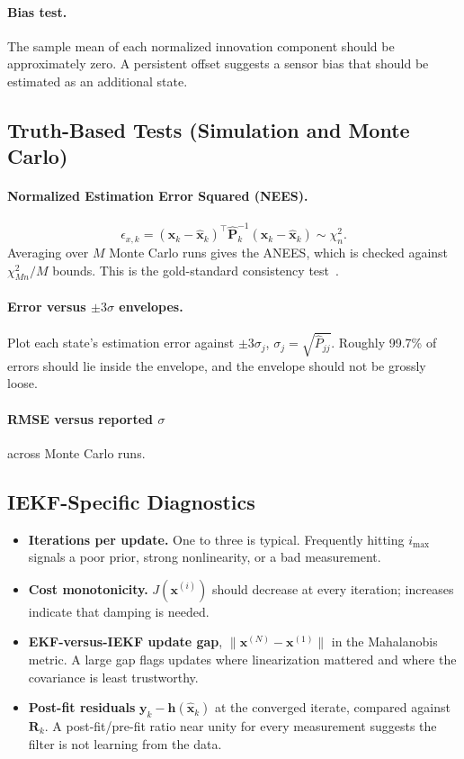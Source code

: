 \documentclass[11pt]{article}
\newcommand{\x}{\bm{x}}
\newcommand{\y}{\bm{y}}
\newcommand{\meas}{\bm{h}}
\newcommand{\Pm}{\bm{P}}
\newcommand{\R}{\bm{R}}
\newcommand{\xhat}{\hat{\x}}
\newcommand{\Phat}{\hat{\Pm}}
\newcommand{\iter}[1]{^{(#1)}}
\begin{document}
\paragraph{Bias test.}
The sample mean of each normalized innovation component should be approximately zero. A
persistent offset suggests a sensor bias that should be estimated as an additional state.

\subsection{Truth-Based Tests (Simulation and Monte Carlo)}

\paragraph{Normalized Estimation Error Squared (NEES).}
\begin{equation}
  \epsilon_{x,k} = (\x_k - \xhat_k)^\top \Phat_k^{-1} (\x_k - \xhat_k) \sim \chi^2_n .
\end{equation}
Averaging over $M$ Monte Carlo runs gives the ANEES, which is checked against
$\chi^2_{Mn}/M$ bounds. This is the gold-standard consistency test~\cite{barshalom2001}.

\paragraph{Error versus $\pm 3\sigma$ envelopes.}
Plot each state's estimation error against $\pm 3\sigma_j$, $\sigma_j = \sqrt{\hat P_{jj}}$.
Roughly 99.7\% of errors should lie inside the envelope, and the envelope should not be
grossly loose.

\paragraph{RMSE versus reported $\sigma$} across Monte Carlo runs.

\subsection{IEKF-Specific Diagnostics}
\begin{itemize}
  \item \textbf{Iterations per update.} One to three is typical. Frequently hitting $i_{\max}$
        signals a poor prior, strong nonlinearity, or a bad measurement.
  \item \textbf{Cost monotonicity.} $J(\x\iter{i})$ should decrease at every iteration;
        increases indicate that damping is needed.
  \item \textbf{EKF-versus-IEKF update gap}, $\|\x\iter{N} - \x\iter{1}\|$ in the Mahalanobis
        metric. A large gap flags updates where linearization mattered and where the
        covariance is least trustworthy.
  \item \textbf{Post-fit residuals} $\y_k - \meas(\xhat_k)$ at the converged iterate, compared
        against $\R_k$. A post-fit/pre-fit ratio near unity for every measurement suggests the
        filter is not learning from the data.
\end{itemize}
\end{document}
